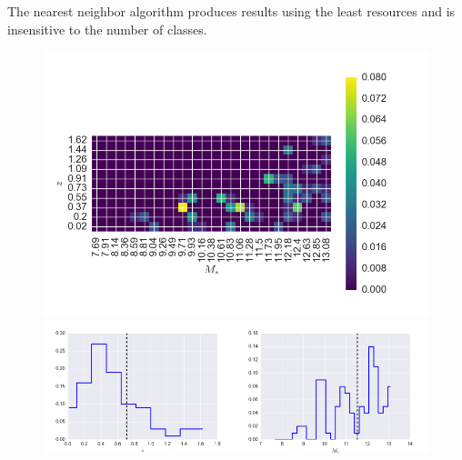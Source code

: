 \documentclass[12pt, preprint]{aastex}
\begin{document}
The nearest neighbor algorithm produces results using the least resources and is insensitive to the number of classes.

\begin{figure}
\includegraphics[width=1.\textwidth]{../fig/knn3.png}\\
\includegraphics[width=0.5\textwidth]{../fig/knn3z.png}\includegraphics[width=0.5\textwidth]{../fig/knn3m.png}
\caption{}
\label{fig:knn-bad}
\end{figure}
\end{document}
